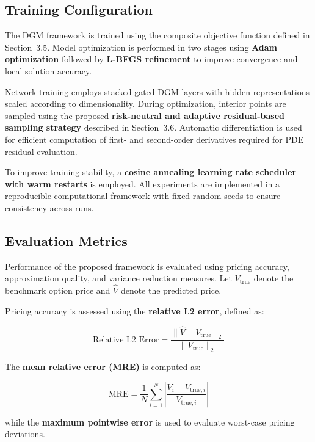 \documentclass[12pt, a4paper]{article}
\begin{document}
\subsection{Training Configuration}

The DGM framework is trained using the composite objective function
defined in Section~3.5. Model optimization is performed in two stages
using \textbf{Adam optimization} followed by \textbf{L-BFGS
refinement} to improve convergence and local solution accuracy.

Network training employs stacked gated DGM layers with hidden
representations scaled according to dimensionality. During
optimization, interior points are sampled using the proposed
\textbf{risk-neutral and adaptive residual-based sampling strategy}
described in Section~3.6. Automatic differentiation is used for
efficient computation of first- and second-order derivatives required
for PDE residual evaluation.

To improve training stability, a \textbf{cosine annealing learning
rate scheduler with warm restarts} is employed. All experiments are
implemented in a reproducible computational framework with fixed random
seeds to ensure consistency across runs.

\subsection{Evaluation Metrics}

Performance of the proposed framework is evaluated using pricing
accuracy, approximation quality, and variance reduction measures. Let
$V_{\mathrm{true}}$ denote the benchmark option price and $\hat{V}$
denote the predicted price.

Pricing accuracy is assessed using the \textbf{relative L2 error},
defined as:

\begin{equation}
    \text{Relative L2 Error}
    = \frac{\|\hat{V} - V_{\mathrm{true}}\|_2}
           {\|V_{\mathrm{true}}\|_2}
    \label{eq:rel_l2}
\end{equation}

The \textbf{mean relative error (MRE)} is computed as:

\begin{equation}
    \text{MRE} = \frac{1}{N} \sum_{i=1}^{N}
    \left|\frac{V_i - V_{\mathrm{true},i}}{V_{\mathrm{true},i}}\right|
    \label{eq:mre}
\end{equation}

while the \textbf{maximum pointwise error} is used to evaluate
worst-case pricing deviations.
\end{document}
